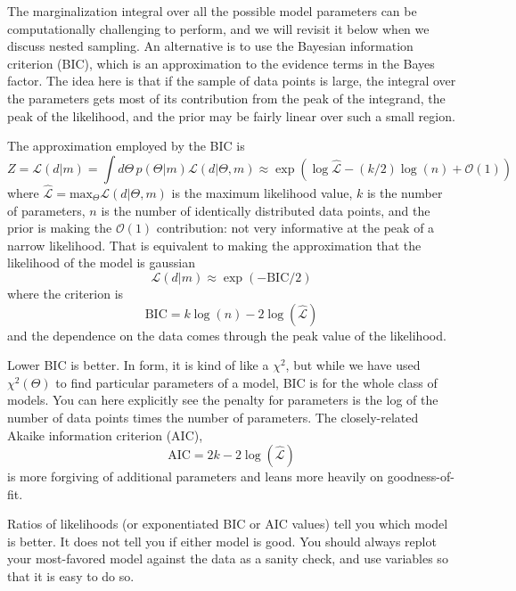 The marginalization integral over all the possible model parameters can be computationally challenging to perform, and we will revisit it below when we discuss nested sampling.  An alternative is to use the Bayesian information criterion (BIC), which is an approximation to the evidence terms in the Bayes factor.  The idea here is that if the sample of data points is large, the integral over the parameters gets most of its contribution from the peak of the integrand, the peak of the likelihood, and the prior may be fairly linear over such a small region.

The approximation employed by the BIC is
\begin{equation}
  Z = \mathcal{L}(d|m) = \int d\Theta\, p(\Theta | m)\mathcal{L}(d|\Theta, m) \approx \exp( \log \hat{\mathcal{L}} - (k/2) \log(n) + \mathcal{O}(1) )
\end{equation}
where $\hat{\mathcal{L}} = \mathrm{max}_\Theta \mathcal{L}(d|\Theta,m)$ is the maximum likelihood value, $k$ is the number of parameters, $n$ is the number of identically distributed data points, and the prior is making the $\mathcal{O}(1)$ contribution: not very informative at the peak of a narrow likelihood.  That is equivalent to making the approximation that the likelihood of the model is gaussian
\begin{equation}
  \mathcal{L}(d|m) \approx \exp( -\mathrm{BIC}/2 )
\end{equation}
where the criterion is
\begin{equation}
  \mathrm{BIC} = k \log(n) - 2 \log(\hat{\mathcal{L}})
\end{equation}
and the dependence on the data comes through the peak value of the likelihood.

Lower BIC is better. In form, it is kind of like a $\chi^2$, but while we have used $\chi^2(\Theta)$ to find particular parameters of a model, BIC is for the whole class of models.  You can here explicitly see the penalty for parameters is the log of the number of data points times the number of parameters.  The closely-related Akaike information criterion (AIC),
\begin{equation}
  \mathrm{AIC} = 2k - 2 \log(\hat{\mathcal{L}})
\end{equation}
is more forgiving of additional parameters and leans more heavily on goodness-of-fit.

Ratios of likelihoods (or exponentiated BIC or AIC values) tell you which model is better.  It does not tell you if either model is good.  You should always replot your most-favored model against the data as a sanity check, and use variables so that it is easy to do so.

